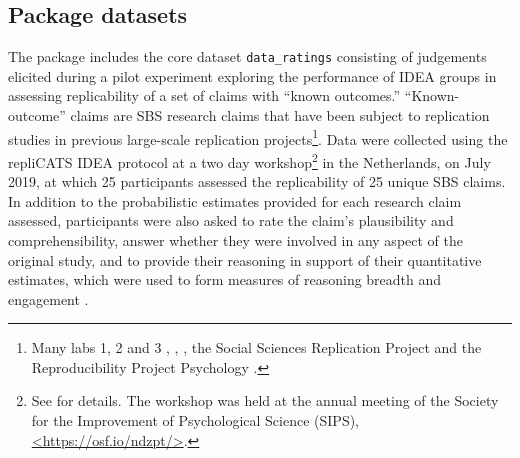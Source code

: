 \documentclass[article]{jss}
\begin{document}
\hypertarget{package-datasets}{%
\subsection{Package datasets}\label{package-datasets}}

The  package includes the core dataset
\texttt{data\_ratings} consisting of judgements elicited during a pilot
experiment exploring the performance of IDEA groups in assessing
replicability of a set of claims with ``known outcomes.''
``Known-outcome'' claims are SBS research claims that have been subject
to replication studies in previous large-scale replication
projects\footnote{Many labs 1, 2 and 3 \citet{Klein2014},
  \citet{Klein2018ManyL2}, \citet{Ebersole2016}, the Social Sciences
  Replication Project \citet{Camerer2018} and the Reproducibility
  Project Psychology \citet{aac4716}.}. Data were collected using the
repliCATS IDEA protocol at a two day workshop\footnote{See
  \citet{Hanea2021} for details. The workshop was held at the annual
  meeting of the Society for the Improvement of Psychological Science
  (SIPS),
  \href{https://osf.io/ndzpt/}{\textless https://osf.io/ndzpt/\textgreater{}}.}
in the Netherlands, on July 2019, at which 25 participants assessed the
replicability of 25 unique SBS claims. In addition to the probabilistic
estimates provided for each research claim assessed, participants were
also asked to rate the claim's plausibility and comprehensibility,
answer whether they were involved in any aspect of the original study,
and to provide their reasoning in support of their quantitative
estimates, which were used to form measures of reasoning breadth and
engagement \citep{Fraser:2021}.
\end{document}
